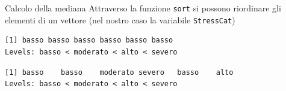 \documentclass[
  ignorenonframetext,
  compress, aspectratio=149]{beamer}
\newenvironment{Shaded}{\begin{snugshade}}{\end{snugshade}}
\newcommand{\AttributeTok}[1]{\textcolor[rgb]{0.13,0.29,0.53}{#1}}
\newcommand{\CommentTok}[1]{\textcolor[rgb]{0.56,0.35,0.01}{\textit{#1}}}
\newcommand{\DecValTok}[1]{\textcolor[rgb]{0.00,0.00,0.81}{#1}}
\newcommand{\FunctionTok}[1]{\textcolor[rgb]{0.13,0.29,0.53}{\textbf{#1}}}
\newcommand{\NormalTok}[1]{#1}
\newcommand{\OtherTok}[1]{\textcolor[rgb]{0.56,0.35,0.01}{#1}}
\newcommand{\SpecialCharTok}[1]{\textcolor[rgb]{0.81,0.36,0.00}{\textbf{#1}}}
\begin{document}
\begin{frame}[fragile]{Calcolo della mediana}
\label{calcolo-della-mediana-1}
Attraverso la funzione \texttt{sort} si possono riordinare gli elementi
di un vettore (nel nostro caso la variabile \texttt{StressCat})

\begin{Shaded}
\end{Shaded}

\begin{verbatim}
[1] basso basso basso basso basso basso
Levels: basso < moderato < alto < severo
\end{verbatim}

\begin{Shaded}
\end{Shaded}

\begin{verbatim}
[1] basso    basso    moderato severo   basso    alto    
Levels: basso < moderato < alto < severo
\end{verbatim}
\end{frame}
\end{document}
